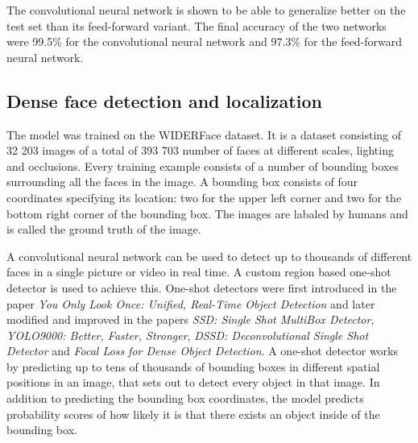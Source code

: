 \documentclass[a4paper, twoside]{article}
\begin{document}
The convolutional neural network is shown to be able to generalize better on the test set than its feed-forward variant. The final accuracy of the two networks were 99.5\% for the convolutional neural network and 97.3\% for the feed-forward neural network. 

\subsection{Dense face detection and localization}
The model was trained on the WIDERFace dataset. It is a dataset consisting of 32 203 images of a total of 393 703 number of faces at different scales, lighting and occlusions. Every training example consists of a number of bounding boxes surrounding all the faces in the image. A bounding box consists of four coordinates specifying its location: two for the upper left corner and two for the bottom right corner of the bounding box. The images are labaled by humans and is called the ground truth of the image. \cite{WIDERFace}

A convolutional neural network can be used to detect up to thousands of different faces in a single picture or video in real time. A custom region based one-shot detector is used to achieve this. One-shot detectors were first introduced in the paper \textit{You Only Look Once: Unified, Real-Time Object Detection} and later modified and improved in the papers \textit{SSD: Single Shot MultiBox Detector}, \textit{YOLO9000: Better, Faster, Stronger}, \textit{DSSD: Deconvolutional Single Shot Detector} and \textit{Focal Loss for Dense Object Detection}. A one-shot detector works by predicting up to tens of thousands of bounding boxes in different spatial positions in an image, that sets out to detect every object in that image. In addition to predicting the bounding box coordinates, the model predicts probability scores of how likely it is that there exists an object inside of the bounding box. \cite{yolo} \cite{ssd} \cite{yolo9000} \cite{dssd} \cite{retinanet}
\end{document}
